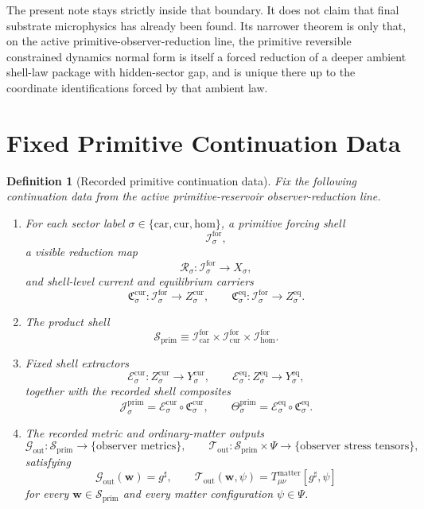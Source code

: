 \documentclass[11pt]{article}
\newcommand{\CompletedMetric}{g^{\sharp}}
\newcommand{\Car}{\mathrm{car}}
\newcommand{\Cur}{\mathrm{cur}}
\newcommand{\Hom}{\mathrm{hom}}
\newcommand{\ForSpace}[1]{\mathcal I_{#1}^{\mathrm{for}}}
\newcommand{\PrimShell}{\mathcal S_{\mathrm{prim}}}
\newcommand{\Reduction}[1]{\mathcal R_{#1}}
\newcommand{\CurrentCarrier}[1]{\mathfrak C_{#1}^{\mathrm{cur}}}
\newcommand{\EqCarrier}[1]{\mathfrak C_{#1}^{\mathrm{eq}}}
\newcommand{\CurrentExtract}[1]{\mathscr E_{#1}^{\mathrm{cur}}}
\newcommand{\EqExtract}[1]{\mathscr E_{#1}^{\mathrm{eq}}}
\newcommand{\PrimCurrent}[1]{\mathcal J_{#1}^{\mathrm{prim}}}
\newcommand{\PrimTheta}[1]{\Theta_{#1}^{\mathrm{prim}}}
\newcommand{\MetricOut}{\mathscr G_{\mathrm{out}}}
\newcommand{\MatterOut}{\mathscr T_{\mathrm{out}}}
\newtheorem{definition}{Definition}
\begin{document}
The present note stays strictly inside that boundary. It does not claim that final substrate microphysics has already been found. Its narrower theorem is only that, on the active primitive-observer-reduction line, the primitive reversible constrained dynamics normal form is itself a forced reduction of a deeper ambient shell-law package with hidden-sector gap, and is unique there up to the coordinate identifications forced by that ambient law.

\section{Fixed Primitive Continuation Data}

\begin{definition}[Recorded primitive continuation data]
\label{def:fixed}
Fix the following continuation data from the active primitive-reservoir observer-reduction line.
\begin{enumerate}
    \item For each sector label \(\sigma\in\{\Car,\Cur,\Hom\}\), a primitive forcing shell
    \[
    \ForSpace{\sigma},
    \]
    a visible reduction map
    \[
    \Reduction{\sigma}:\ForSpace{\sigma}\to X_{\sigma},
    \]
    and shell-level current and equilibrium carriers
    \[
    \CurrentCarrier{\sigma}:\ForSpace{\sigma}\to Z_{\sigma}^{\mathrm{cur}},
    \qquad
    \EqCarrier{\sigma}:\ForSpace{\sigma}\to Z_{\sigma}^{\mathrm{eq}}.
    \]
    \item The product shell
    \[
    \PrimShell
    \equiv
    \ForSpace{\Car}\times \ForSpace{\Cur}\times \ForSpace{\Hom}.
    \]
    \item Fixed shell extractors
    \[
    \CurrentExtract{\sigma}:Z_{\sigma}^{\mathrm{cur}}\to Y_{\sigma}^{\mathrm{cur}},
    \qquad
    \EqExtract{\sigma}:Z_{\sigma}^{\mathrm{eq}}\to Y_{\sigma}^{\mathrm{eq}},
    \]
    together with the recorded shell composites
    \begin{equation}
    \PrimCurrent{\sigma}
    =
    \CurrentExtract{\sigma}\circ \CurrentCarrier{\sigma},
    \qquad
    \PrimTheta{\sigma}
    =
    \EqExtract{\sigma}\circ \EqCarrier{\sigma}.
    \label{eq:primcomposites}
    \end{equation}
    \item The recorded metric and ordinary-matter outputs
    \[
    \MetricOut:\PrimShell\to\{\text{observer metrics}\},
    \qquad
    \MatterOut:\PrimShell\times\Psi\to\{\text{observer stress tensors}\},
    \]
    satisfying
    \begin{equation}
    \MetricOut(\mathbf w)=\CompletedMetric,
    \qquad
    \MatterOut(\mathbf w,\psi)
    =
    T_{\mu\nu}^{\mathrm{matter}}[\CompletedMetric,\psi]
    \label{eq:fixedoutputs}
    \end{equation}
    for every \(\mathbf w\in\PrimShell\) and every matter configuration \(\psi\in\Psi\).
\end{enumerate}
\end{definition}
\end{document}
